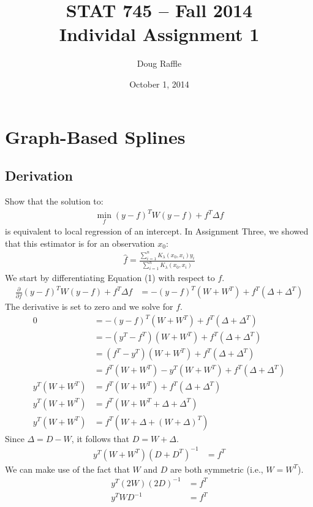 \documentclass[a4paper]{article}
\title{\vspace{-30pt}STAT 745 -- Fall 2014\\Individal Assignment 1}
\author{Doug Raffle}
\date{October 1, 2014}
\begin{document}
\setlength{\parindent}{0pt}
\vspace{-50pt}
\maketitle

\section{Graph-Based Splines}
\subsection{Derivation}
Show that the solution to:
\begin{align}
  \min_f\left(y-f\right)^TW\left(y-f\right)+f^T\Delta f
\end{align}
is equivalent to local regression of an intercept.  In Assignment Three, we showed
that this estimator is for an observation $x_0$:
\begin{align}
  \hat{f} = \frac{\sum_{i=1}^n K_\lambda(x_0, x_i)y_i}
                   {\sum_{i=1}^n K_\lambda(x_0, x_i)}
\end{align}
We start by differentiating Equation (1) with respect to $f$.
\begin{align*}
  \frac{\partial}{\partial f} \left(y-f\right)^TW\left(y-f\right)+f^T\Delta f
  &= -(y - f)^T(W + W^T) + f^T(\Delta + \Delta^T)
\end{align*}
The derivative is set to zero and we solve for $f$.
\begin{align*}
  0 &= -(y - f)^T(W + W^T) + f^T(\Delta + \Delta^T)\\
    &= -(y^T - f^T)(W + W^T) + f^T(\Delta + \Delta^T)\\
    &= (f^T - y^T)(W + W^T) + f^T(\Delta + \Delta^T)\\
    &= f^T(W + W^T) - y^T(W + W^T) + f^T(\Delta + \Delta^T)\\
    y^T(W + W^T)&= f^T(W + W^T) + f^T(\Delta + \Delta^T)\\
    y^T(W + W^T)&= f^T(W+ W^T + \Delta + \Delta^T)\\
    y^T(W + W^T)&= f^T(W + \Delta + (W + \Delta)^T)
\end{align*}
Since $\Delta = D - W$, it follows that $D = W + \Delta$.
\begin{align*}
  y^T(W + W^T)(D + D^T)^{-1}&= f^T
\end{align*}
We can make use of the fact that $W$ and $D$ are both symmetric (i.e., $W = W^T$).
\begin{align*}
  y^T(2W)(2D)^{-1}&= f^T\\
  y^TWD^{-1}&= f^T
\end{align*}
\end{document}
